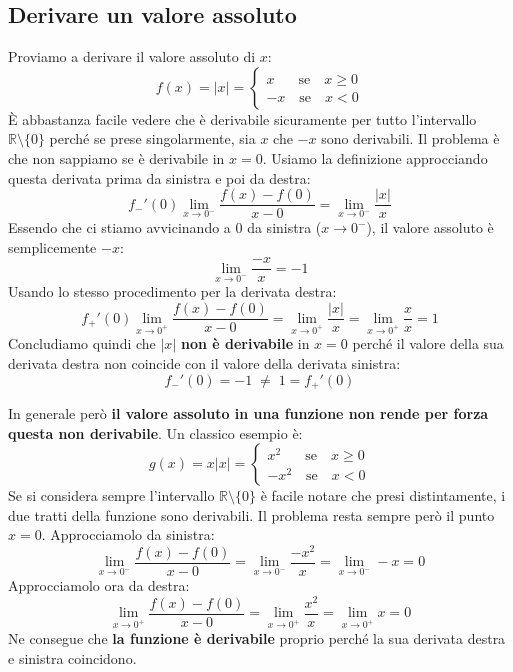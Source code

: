 \subsection{Derivare un valore assoluto}
Proviamo a derivare il valore assoluto di $x$:
\begin{equation*}
    f(x) = |x| =
    \begin{cases*}
        x \quad \;\;\, \text{se} \quad x \geq 0\\
        -x \quad \text{se} \quad x < 0
    \end{cases*}
\end{equation*}
È abbastanza facile vedere che è derivabile sicuramente per tutto l'intervallo $\mathbb{R} \setminus \{0\}$ perché se prese singolarmente, sia $x$ che $-x$ sono derivabili. Il problema è che non sappiamo se è derivabile in $x = 0$. Usiamo la definizione approcciando questa derivata prima da sinistra e poi da destra:
\begin{equation*}
	f_-' (0) \lim_{x \to 0^-} \dfrac{f(x) - f(0)}{x -0} = \lim_{x \to 0^-} \dfrac{|x|}{x}
\end{equation*}
Essendo che ci stiamo avvicinando a $0$ da sinistra ($x \to 0^-$), il valore assoluto è semplicemente $-x$:
\begin{equation*}
	\lim_{x \to 0^-} \dfrac {-x}{x} = -1
\end{equation*} 
Usando lo stesso procedimento per la derivata destra:
\begin{equation*}
	f_+' (0) \lim_{x \to 0^+} \dfrac{f(x) - f(0)}{x -0} = \lim_{x \to 0^+} \dfrac{|x|}{x} = \lim_{x \to 0^+} \dfrac {x}{x} = 1
\end{equation*}
Concludiamo quindi che $|x|$ \textbf{non è derivabile} in $x = 0$ perché il valore della sua derivata destra non coincide con il valore della derivata sinistra:
\begin{equation*}
	f_-' (0) = -1 \; \neq \; 1 = f_+'(0)
\end{equation*}

In generale però \textbf{il valore assoluto in una funzione non rende per forza questa non derivabile}. Un classico esempio è:
\begin{equation*}
	g(x) = x|x| = 
	\begin{cases*}
		x^2 \quad \;\;\, \text{se} \quad x \geq 0\\
		-x^2 \quad \text{se} \quad x < 0
	\end{cases*}
\end{equation*}
Se si considera sempre l'intervallo $\mathbb{R} \setminus \{0\}$ è facile notare che presi distintamente, i due tratti della funzione sono derivabili. Il problema resta sempre però il punto $x = 0$. Approcciamolo da sinistra:
\begin{equation*}
	\lim_{x \to 0^-} \dfrac{f(x) - f(0)}{x - 0} = \lim_{x \to 0^-} \dfrac{-x^2}{x} = \lim_{x \to 0^-} -x = 0
\end{equation*}
Approcciamolo ora da destra:
\begin{equation*}
	\lim_{x \to 0^+} \dfrac{f(x) - f(0)}{x - 0} = \lim_{x \to 0^+} \dfrac{x^2}{x} = \lim_{x \to 0^+} x = 0
\end{equation*}
Ne consegue che \textbf{la funzione è derivabile} proprio perché la sua derivata destra e sinistra coincidono.

